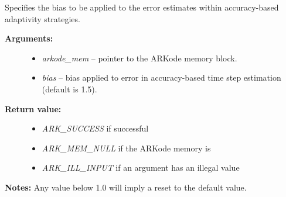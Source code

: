 \documentclass[letterpaper,10pt,english]{sphinxmanual}
\begin{document}

\begin{fulllineitems}
\label{c_interface/User_callable:ARKodeSetErrorBias}
Specifies the bias to be applied to the error estimates within
accuracy-based adaptivity strategies.
\begin{description}
\item[{\textbf{Arguments:}}] \leavevmode\begin{itemize}
\item {} 
\emph{arkode\_mem} -- pointer to the ARKode memory block.

\item {} 
\emph{bias} -- bias applied to error in accuracy-based time
step estimation (default is 1.5).

\end{itemize}

\item[{\textbf{Return value:}}] \leavevmode\begin{itemize}
\item {} 
\emph{ARK\_SUCCESS} if successful

\item {} 
\emph{ARK\_MEM\_NULL} if the ARKode memory is 

\item {} 
\emph{ARK\_ILL\_INPUT} if an argument has an illegal value

\end{itemize}

\end{description}

\textbf{Notes:} Any value below 1.0 will imply a reset to the default value.

\end{fulllineitems}

\end{document}
